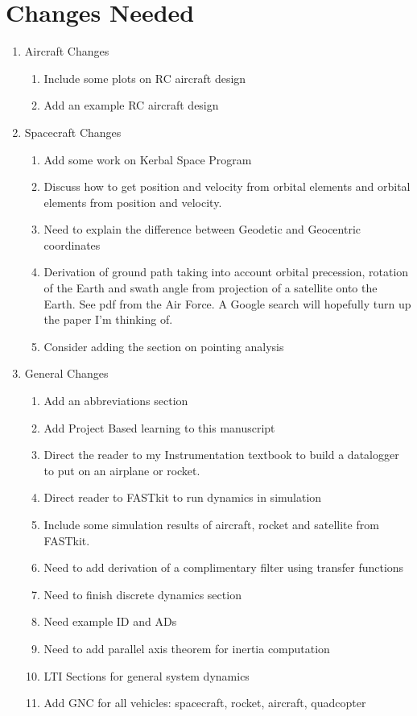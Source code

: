 \section*{Changes Needed}

\begin{enumerate}[itemsep=-5pt]
  \item Aircraft Changes
    \begin{enumerate}[itemsep=-5pt]
    \item Include some plots on RC aircraft design
    \item Add an example RC aircraft design
    \end{enumerate}
\item Spacecraft Changes
  \begin{enumerate}[itemsep=-5pt]
  \item Add some work on Kerbal Space Program
  \item Discuss how to get position and velocity from orbital elements and orbital elements
    from position and velocity.
  \item Need to explain the difference between Geodetic and Geocentric
    coordinates
  \item Derivation of ground path taking into account orbital
    precession, rotation of the Earth and swath angle from projection of
    a satellite onto the Earth. See pdf from the Air Force. A Google
    search will hopefully turn up the paper I'm thinking of.
  \item Consider adding the section on pointing analysis
  \end{enumerate}
\item General Changes
  \begin{enumerate}[itemsep=-5pt]
  \item Add an abbreviations section
  \item Add Project Based learning to this manuscript
  \item Direct the reader to my Instrumentation textbook to build a
    datalogger to put on an airplane or rocket.
  \item Direct reader to FASTkit to run dynamics in simulation
  \item Include some simulation results of aircraft, rocket and
    satellite from FASTkit.
  \item Need to add derivation of a complimentary filter using
    transfer functions
  \item Need to finish discrete dynamics section
  \item Need example ID and ADs
  \item Need to add parallel axis theorem for inertia computation
  \item LTI Sections for general system dynamics
  \item Add GNC for all vehicles: spacecraft, rocket, aircraft, quadcopter
  \end{enumerate}
\end{enumerate}

